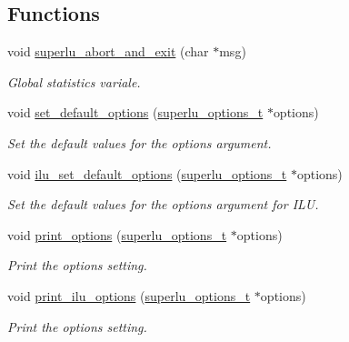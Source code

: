 \subsection*{Functions}
\begin{DoxyCompactItemize}
\item 
void \hyperlink{scipy-0_814_80_2scipy_2sparse_2linalg_2dsolve_2SuperLU_2SRC_2util_8c_a060bded38730c2e58fa7f7e19c43ba08}{superlu\+\_\+abort\+\_\+and\+\_\+exit} (char $\ast$msg)
\begin{DoxyCompactList}\small\item\em Global statistics variale. \end{DoxyCompactList}\item 
void \hyperlink{scipy-0_814_80_2scipy_2sparse_2linalg_2dsolve_2SuperLU_2SRC_2util_8c_a4792687285a879f7955029421ba99795}{set\+\_\+default\+\_\+options} (\hyperlink{structsuperlu__options__t}{superlu\+\_\+options\+\_\+t} $\ast$options)
\begin{DoxyCompactList}\small\item\em Set the default values for the options argument. \end{DoxyCompactList}\item 
void \hyperlink{scipy-0_814_80_2scipy_2sparse_2linalg_2dsolve_2SuperLU_2SRC_2util_8c_afce6cba2b855a4b046f6521d5dd1beb4}{ilu\+\_\+set\+\_\+default\+\_\+options} (\hyperlink{structsuperlu__options__t}{superlu\+\_\+options\+\_\+t} $\ast$options)
\begin{DoxyCompactList}\small\item\em Set the default values for the options argument for I\+L\+U. \end{DoxyCompactList}\item 
void \hyperlink{scipy-0_814_80_2scipy_2sparse_2linalg_2dsolve_2SuperLU_2SRC_2util_8c_a3a041511849362ed44688698c86a9039}{print\+\_\+options} (\hyperlink{structsuperlu__options__t}{superlu\+\_\+options\+\_\+t} $\ast$options)
\begin{DoxyCompactList}\small\item\em Print the options setting. \end{DoxyCompactList}\item 
void \hyperlink{scipy-0_814_80_2scipy_2sparse_2linalg_2dsolve_2SuperLU_2SRC_2util_8c_af68d6594a77880eedb6c7b35aef237ac}{print\+\_\+ilu\+\_\+options} (\hyperlink{structsuperlu__options__t}{superlu\+\_\+options\+\_\+t} $\ast$options)
\begin{DoxyCompactList}\small\item\em Print the options setting. \end{DoxyCompactList}\item 

\end{DoxyCompactItemize}
